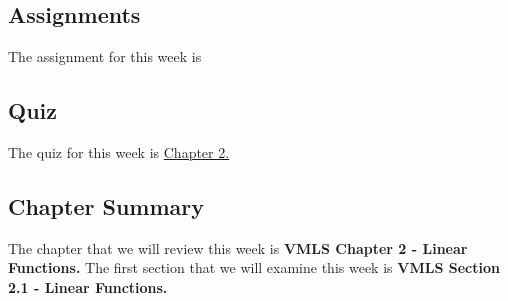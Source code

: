 \subsection{Assignments}

The assignment for this week is   

\subsection{Quiz}

The quiz for this week is \href{https://applied.cs.colorado.edu/mod/quiz/view.php?id=50687}{Chapter 2.}  

\subsection{Chapter Summary}

The chapter that we will review this week is \textbf{VMLS Chapter 2 - Linear Functions.} The first section that we will examine this week is \textbf{VMLS Section 2.1 - Linear Functions.}

